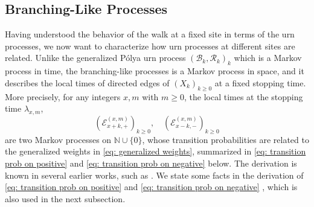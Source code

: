 \documentclass[twoside,12pt,a4paper]{article}
\numberwithin{equation}{section}
\begin{document}
		\subsection{Branching-Like Processes}
		Having understood the behavior of the walk at a fixed site in terms of the urn processes, we now want to characterize how urn processes at different sites are related. Unlike the generalized P\'{o}lya urn process $(\mathcal{B}_k,\mathcal{R}_k )_k$ which is a Markov process in time, the branching-like processes is a Markov process in space, and it describes the local times of directed edges of $(X_k)_{k\geq 0}$ at a fixed stopping time.
		More precisely, for any integers $x,m$ with $m\geq 0$, the local times at the stopping time $\lambda_{x,m}$, 
		\[
		 \left(\mathcal{E}^{(x,m)}_{x+k,+} \right)_{k\geq 0}, \quad \left(\mathcal{E}^{(x,m)}_{x-k,-} \right)_{k\geq 0}
		\]
		are two Markov processes on $\mathbb{N}\cup\{0\}$, whose transition probabilities are related to the generalized weights in \eqref{eq: generalized weights}, summarized in \eqref{eq: transition prob on positive} and \eqref{eq: transition prob on negative} below. The derivation is known in several earlier works, such as \cite{T96, KP16}. We state some facts in the derivation of \eqref{eq: transition prob on positive} and \eqref{eq: transition prob on negative} , which is also used in the next subsection.
		
\end{document}
